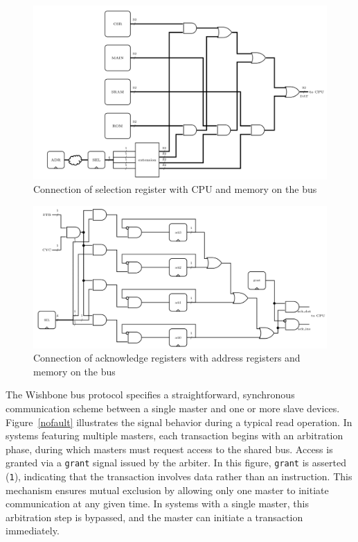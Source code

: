 \begin{figure}[t!]
  \centering
  \includegraphics[width=1.1\linewidth]{Chapitre3/figures/sel.png}
  \caption{Connection of selection register with CPU and memory on the bus}
  \label{sel}
\end{figure}

\begin{figure}[t!]
  \centering
  \includegraphics[width=1.1\linewidth]{Chapitre3/figures/ack.png}
  \caption{Connection of acknowledge registers with address registers and memory on the bus}
  \label{ack}
\end{figure}

The Wishbone bus protocol specifies a straightforward, synchronous communication scheme between a single master and one or more slave devices. Figure~\ref{nofault} illustrates the signal behavior during a typical read operation. In systems featuring multiple masters, each transaction begins with an arbitration phase, during which masters must request access to the shared bus. Access is granted via a \texttt{grant} signal issued by the arbiter. In this figure, \texttt{grant} is asserted (\texttt{1}), indicating that the transaction involves data rather than an instruction. This mechanism ensures mutual exclusion by allowing only one master to initiate communication at any given time. In systems with a single master, this arbitration step is bypassed, and the master can initiate a transaction immediately.

